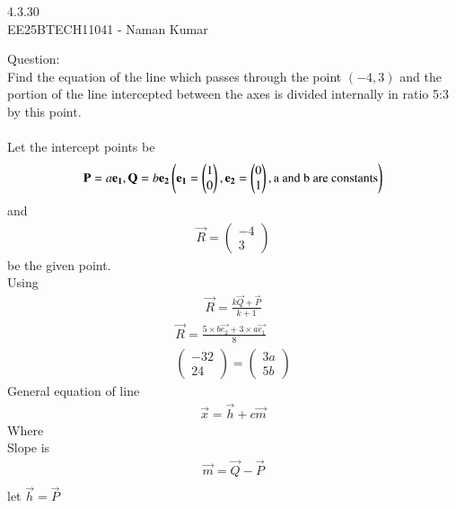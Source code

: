 \documentclass[journal]{IEEEtran}
\author{EE25BTECH11041-Naman Kumar }
\begin{document}
\begin{center}
    \huge{4.3.30}\\
    \large{EE25BTECH11041 - Naman Kumar}
\end{center}
Question:\\
Find the equation of the line which passes through the point $(-4, 3)$ and the portion of the line intercepted between the axes is divided internally in ratio 5:3 by this point.\\
\solution \\
Let the intercept points be
\begin{align}
    \mathbf{P}=a\mathbf{e_1},\mathbf{Q}=b\mathbf{e_2} \left(\mathbf{e_1}=\begin{pmatrix}1\\0\end{pmatrix}, \mathbf{e_2}=\begin{pmatrix}0\\1\end{pmatrix}, \text{a and b are constants}\right)
\end{align}
and
\begin{align}
    \vec{R}=\begin{pmatrix}-4\\3\end{pmatrix}
\end{align}
be the given point.\\
Using
\begin{align}
    \vec{R}=\frac{k\vec{Q}+\vec{P}}{k+1} \label{section}
\end{align}
\begin{align}
    \vec{R}=\frac{5\times b\vec{e_2}+3\times a\vec{e_1}}{8}\\
    \begin{pmatrix}-32\\24\end{pmatrix}=\begin{pmatrix}3a\\5b\end{pmatrix} \label{points}
\end{align}
General equation of line
\begin{align}
    \vec{x}=\vec{h}+c\vec{m}
\end{align}
Where\\

\newpage
Slope is
\begin{align}
\vec{m}=\vec{Q}-\vec{P}\\
\end{align}
let $\vec{h}=\vec{P}$\\
\end{document}
